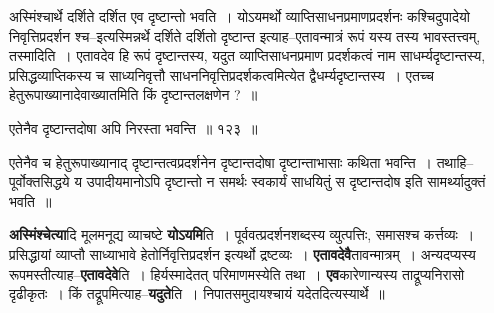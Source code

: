 \documentclass[article,12pt,a4paper]{memoir}
\begin{document}
	  \pstart अस्मिंश्चार्थे दर्शिते दर्शित एव दृष्टान्तो भवति । योऽयमर्थो व्याप्तिसाधनप्रमाणप्रदर्शनः कश्चिदुपादेयो निवृत्तिप्रदर्शन श्च--इत्यस्मिन्नर्थे दर्शिते दर्शितो दृष्टान्त इत्याह--एतावन्मात्रं रूपं यस्य तस्य भावस्तत्त्वम्, तस्मादिति । एतावदेव हि रूपं दृष्टान्तस्य, यदुत व्याप्तिसाधनप्रमाण प्रदर्शकत्वं नाम साधर्म्यदृष्टान्तस्य, प्रसिद्धव्याप्तिकस्य च साध्यनिवृत्तौ साधननिवृत्तिप्रदर्शकत्वमित्येत द्वैधर्म्यदृष्टान्तस्य । एतच्च हेतुरूपाख्यानादेवाख्यातमिति किं दृष्टान्तलक्षणेन ? ॥
	\pend
        
	  \bigskip
	  \begingroup
	

	  \pstart एतेनैव दृष्टान्तदोषा अपि निरस्ता भवन्ति ॥ १२३ ॥
	\pend
      
	  \endgroup
	 

	  \pstart एतेनैव च हेतुरूपाख्यानाद् दृष्टान्तत्वप्रदर्शनेन दृष्टान्तदोषा दृष्टान्ताभासाः कथिता भवन्ति । तथाहि--पूर्वोक्तसिद्धये य उपादीयमानोऽपि दृष्टान्तो न समर्थः स्वकार्यं साधयितुं स दृष्टान्तदोष इति सामर्थ्यादुक्तं भवति ॥
	\pend
      
	  \endgroup
	

	  \pstart \textbf{अस्मिंश्चेत्या}दि मूलमनूद्य व्याचष्टे \textbf{योऽयमि}ति । पूर्ववत्प्रदर्शनशब्दस्य व्युत्पत्तिः, समासश्च कर्त्तव्यः । प्रसिद्धायां व्याप्तौ साध्या\leavevmode{}भावे हेतोर्निवृत्तिप्रदर्शन इत्यर्थो द्रष्टव्यः । \textbf{एतावदेवै}तावन्मात्रम् । अन्यदप्यस्य रूपमस्तीत्याह--\textbf{एतावदेवे}ति । हिर्यस्मादेतत् परिमाणमस्येति तथा । \textbf{एव}कारेणान्यस्य ताद्रूप्यनिरासो दृढीकृतः । किं तद्रूपमित्याह--\textbf{यदुते}ति । निपातसमुदायश्चायं यदेतदित्यस्यार्थे ॥
	\pend
      
\end{document}
